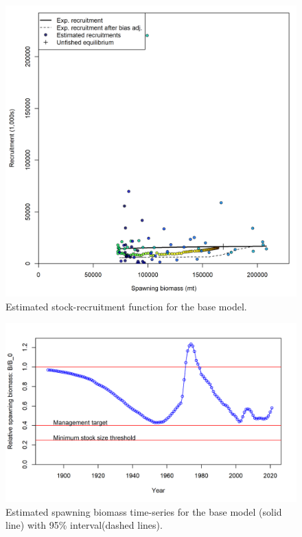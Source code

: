 \documentclass[11pt,
  english,
  a4paper,
]{article}
\begin{document}
\tagmcend\tagstructend


\begin{figure}
\centering
\includegraphics[width=1\textwidth,height=1\textheight]{figs/SR_curve.png}
\caption{Estimated stock-recruitment function for the base model. \label{fig:SR_curve}}
\end{figure}

\tagmcend\tagstructend


\begin{figure}
\centering
\includegraphics[width=1\textwidth,height=1\textheight]{figs/ts9_Relative_spawning_biomass.png}
\caption{Estimated spawning biomass time-series for the base model (solid line) with 95\% interval(dashed lines).\label{ts9}}
\end{figure}
\end{document}
